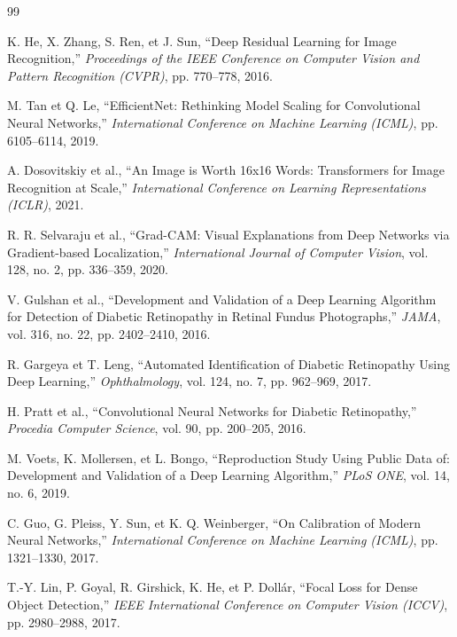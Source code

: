 \documentclass[12pt,a4paper,oneside]{report}
\begin{document}
\begin{thebibliography}{99}

K. He, X. Zhang, S. Ren, et J. Sun,
``Deep Residual Learning for Image Recognition,''
\textit{Proceedings of the IEEE Conference on Computer Vision and Pattern Recognition (CVPR)},
pp. 770--778, 2016.

M. Tan et Q. Le,
``EfficientNet: Rethinking Model Scaling for Convolutional Neural Networks,''
\textit{International Conference on Machine Learning (ICML)},
pp. 6105--6114, 2019.

A. Dosovitskiy et al.,
``An Image is Worth 16x16 Words: Transformers for Image Recognition at Scale,''
\textit{International Conference on Learning Representations (ICLR)},
2021.

R. R. Selvaraju et al.,
``Grad-CAM: Visual Explanations from Deep Networks via Gradient-based Localization,''
\textit{International Journal of Computer Vision},
vol. 128, no. 2, pp. 336--359, 2020.

V. Gulshan et al.,
``Development and Validation of a Deep Learning Algorithm for Detection of Diabetic Retinopathy in Retinal Fundus Photographs,''
\textit{JAMA}, vol. 316, no. 22, pp. 2402--2410, 2016.

R. Gargeya et T. Leng,
``Automated Identification of Diabetic Retinopathy Using Deep Learning,''
\textit{Ophthalmology}, vol. 124, no. 7, pp. 962--969, 2017.

H. Pratt et al.,
``Convolutional Neural Networks for Diabetic Retinopathy,''
\textit{Procedia Computer Science}, vol. 90, pp. 200--205, 2016.

M. Voets, K. Mollersen, et L. Bongo,
``Reproduction Study Using Public Data of: Development and Validation of a Deep Learning Algorithm,''
\textit{PLoS ONE}, vol. 14, no. 6, 2019.

C. Guo, G. Pleiss, Y. Sun, et K. Q. Weinberger,
``On Calibration of Modern Neural Networks,''
\textit{International Conference on Machine Learning (ICML)},
pp. 1321--1330, 2017.

T.-Y. Lin, P. Goyal, R. Girshick, K. He, et P. Doll\'{a}r,
``Focal Loss for Dense Object Detection,''
\textit{IEEE International Conference on Computer Vision (ICCV)},
pp. 2980--2988, 2017.

\end{thebibliography}
\end{document}
